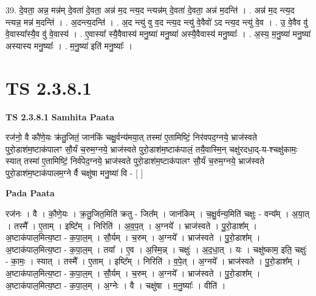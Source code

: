 \documentclass[17pt]{extarticle}
\begin{document}
39. दे॒वता॒ अन्न॒ मन्न॑म् दे॒वता॑ दे॒वता॒ अन्न॑ म॒द न्त्य॒द न्त्यन्न॑म् दे॒वता॑ दे॒वता॒ अन्न॑ म॒दन्ति॑ । . अन्न॑ म॒द न्त्य॒द न्त्यन्न॒ मन्न॑ म॒दन्ति॑ । . अ॒दन्त्य॒दन्ति॑ । . अ॒द न्त्यु॑ वु व॒द न्त्य॒द न्त्यु॑ वे॒वैवो॑ ऽद न्त्य॒द न्त्यु॑ वे॒व । . उ॒ वे॒वैव वु॑ वे॒वास्या᳚स्यै॒व वु॑ वे॒वास्य॑ । . ए॒वास्या᳚ स्यै॒वैवास्य॑ मनु॒ष्या॑ मनु॒ष्या॑ अस्यै॒वैवास्य॑ मनु॒ष्याः᳚ । . अ॒स्य॒ म॒नु॒ष्या॑ मनु॒ष्या॑ अस्यास्य मनु॒ष्याः᳚ । . म॒नु॒ष्या॑ इति॑ मनु॒ष्याः᳚ । \newline
\pagebreak
{}

\section{ TS 2.3.8.1 }

\textbf{TS 2.3.8.1 } \newline
\textbf{Samhita Paata} \newline

रज॑नो॒ वै कौ॑णे॒यः क्र॑तु॒जितं॒ जान॑किं चक्षु॒र्वन्य॑मया॒त् तस्मा॑ ए॒तामिष्टिं॒ निर॑वपद॒ग्नये॒ भ्राज॑स्वते पुरो॒डाश॑म॒ष्टाक॑पालꣳ सौ॒र्यं च॒रुम॒ग्नये॒ भ्राज॑स्वते पुरो॒डाश॑म॒ष्टाक॑पालं॒ तयै॒वास्मि॒न् चक्षु॑रदधा॒द्-य-श्चक्षु॑कामः॒ स्यात् तस्मा॑ ए॒तामिष्टिं॒ निर्व॑पेद॒ग्नये॒ भ्राज॑स्वते पुरो॒डाश॑म॒ष्टाक॑पालꣳ सौ॒र्यं च॒रुम॒ग्नये॒ भ्राज॑स्वते पुरो॒डाश॑म॒ष्टाक॑पालम॒ग्ने र्वै चक्षु॑षा मनु॒ष्या॑ वि - [  ] \newline

\textbf{Pada Paata} \newline

रज॑नः । वै । कौ॒णे॒यः । क्र॒तु॒जित॒मिति॑ क्रतु - जित᳚म् । जान॑किम् । च॒क्षु॒र्वन्य॒मिति॑ चक्षुः - वन्य᳚म् । अ॒या॒त् । तस्मै᳚ । ए॒ताम् । इष्टि᳚म् । निरिति॑ । अ॒व॒प॒त् । अ॒ग्नये᳚ । भ्राज॑स्वते । पु॒रो॒डाश᳚म् । अ॒ष्टाक॑पाल॒मित्य॒ष्टा - क॒पा॒ल॒म् । सौ॒र्यम् । च॒रुम् । अ॒ग्नये᳚ । भ्राज॑स्वते । पु॒रो॒डाश᳚म् । अ॒ष्टाक॑पाल॒मित्य॒ष्टा - क॒पा॒ल॒म् । तया᳚ । ए॒व । अ॒स्मि॒न्न् । चक्षुः॑ । अ॒द॒धा॒त् । यः । चक्षु॑ष्काम॒ इति॒ चक्षुः॑ - का॒मः॒ । स्यात् । तस्मै᳚ । ए॒ताम् । इष्टि᳚म् । निरिति॑ । व॒पे॒त् । अ॒ग्नये᳚ । भ्राज॑स्वते । पु॒रो॒डाश᳚म् । अ॒ष्टाक॑पाल॒मित्य॒ष्टा - क॒पा॒ल॒म् । सौ॒र्यम् । च॒रुम् । अ॒ग्नये᳚ । भ्राज॑स्वते । पु॒रो॒डाश᳚म् । अ॒ष्टाक॑पाल॒मित्य॒ष्टा - क॒पा॒ल॒म् । अ॒ग्नेः । वै । चक्षु॑षा । म॒नु॒ष्याः᳚ । वीति॑ ।  \newline
\end{document}
